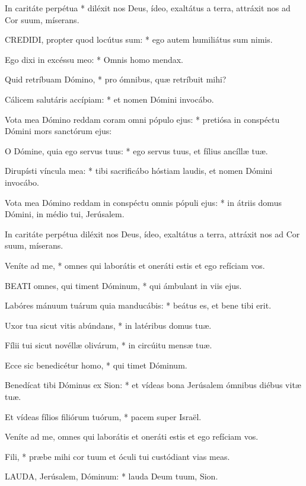  In caritáte perpétua * diléxit nos Deus, ídeo, exaltátus a terra, attráxit nos ad Cor suum, míserans.


\lettrine[lines=2]{C}{REDIDI}, propter quod locútus sum: * ego autem humiliátus sum nimis.

Ego dixi in excéssu meo: * Omnis homo mendax.

Quid retríbuam Dómino, * pro ómnibus, quæ retríbuit mihi?

Cálicem salutáris accípiam: * et nomen Dómini invocábo.

Vota mea Dómino reddam coram omni pópulo ejus: * pretiósa in conspéctu Dómini mors sanctórum ejus:

O Dómine, quia ego servus tuus: * ego servus tuus, et fílius ancíllæ tuæ.

Dirupísti víncula mea: * tibi sacrificábo hóstiam laudis, et nomen Dómini invocábo.

Vota mea Dómino reddam in conspéctu omnis pópuli ejus: * in átriis domus Dómini, in médio tui, Jerúsalem.

 In caritáte perpétua diléxit nos Deus, ídeo, exaltátus a terra, attráxit nos ad Cor suum, míserans.

 Veníte ad me, * omnes qui laborátis et oneráti estis et ego refíciam vos.


\lettrine[lines=2]{B}{EATI} omnes, qui timent Dóminum, * qui ámbulant in viis ejus.

Labóres mánuum tuárum quia manducábis: * beátus es, et bene tibi erit.

Uxor tua sicut vitis abúndans, * in latéribus domus tuæ.

Fílii tui sicut novéllæ olivárum, * in circúitu mensæ tuæ.

Ecce sic benedicétur homo, * qui timet Dóminum.

Benedícat tibi Dóminus ex Sion: * et vídeas bona Jerúsalem ómnibus diébus vitæ tuæ.

Et vídeas fílios filiórum tuórum, * pacem super Israël.

 Veníte ad me, omnes qui laborátis et oneráti estis et ego refíciam vos.

 Fili, * præbe mihi cor tuum et óculi tui custódiant vias meas.


\lettrine[lines=2]{L}{AUDA}, Jerúsalem, Dóminum: * lauda Deum tuum, Sion.

